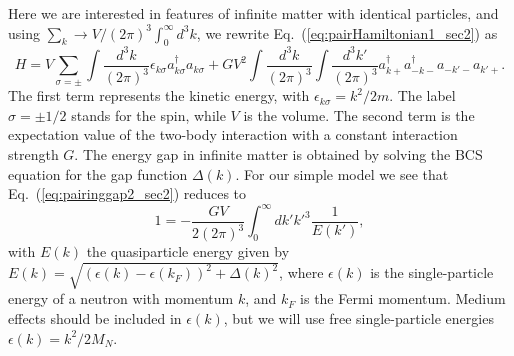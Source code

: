 \documentclass[rmp,aps,floatfix]{revtex4}
\begin{document}
Here we are interested in features of infinite matter with
identical particles, and using
$\sum_k\rightarrow V/(2\pi)^3\int_0^{\infty}d^3k$, we rewrite 
Eq.~(\ref{eq:pairHamiltonian1_sec2}) as
\begin{equation}
   H=V\sum_{\sigma=\pm}\int\frac{d^3k}{(2\pi)^3} 
     \epsilon_{k\sigma}a_{k\sigma}^{\dagger}a_{k\sigma}
     +GV^2\int\frac{d^3k}{(2\pi)^3}\int\frac{d^3k'}{(2\pi)^3}
     a_{k+}^{\dagger}a_{-k-}^{\dagger}a_{-k'-}a_{k'+}.
\end{equation}
The first term represents the kinetic energy, with 
$\epsilon_{k\sigma}=k^2/2m$. The label 
$\sigma=\pm 1/2$ stands for the spin, while $V$ is the volume. 
The second term is the 
expectation value of the two-body
interaction with a constant interaction strength $G$.
The energy gap in infinite matter is obtained by solving the BCS equation 
for the gap function $\Delta(k)$. For our simple model  
we see that Eq.~(\ref{eq:pairinggap2_sec2}) reduces to
\begin{equation}
      1=-\frac{GV}{2(2\pi)^3}\int_{0}^{\infty}dk'k'^3 
                 \frac{1}{E(k')},
       \label{eq:pairinggap1_sec2}
\end{equation}
with $E(k)$ the quasiparticle energy given by 
$E(k)=\sqrt{(\epsilon(k)-\epsilon(k_F))^2+\Delta(k)^2}$, where 
$\epsilon(k)$ is the single-particle energy of a neutron with 
momentum $k$, and $k_F$ is the Fermi momentum.  
Medium effects should 
be included in $\epsilon(k)$, but we will use free single-particle 
energies $\epsilon(k)=k^{2}/2M_N$.
\end{document}

